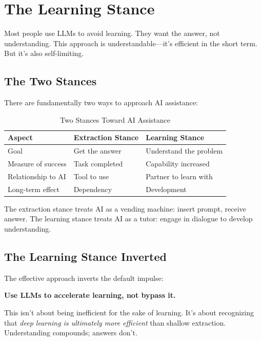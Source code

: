 \chapter{The Learning Stance}

Most people use LLMs to avoid learning. They want the answer, not understanding. This approach is understandable---it's efficient in the short term. But it's also self-limiting.

\section{The Two Stances}

There are fundamentally two ways to approach AI assistance:

\begin{table}[H]
\centering
\begin{tabular}{lp{5cm}p{5cm}}
\toprule
\textbf{Aspect} & \textbf{Extraction Stance} & \textbf{Learning Stance} \\
\midrule
Goal & Get the answer & Understand the problem \\
Measure of success & Task completed & Capability increased \\
Relationship to AI & Tool to use & Partner to learn with \\
Long-term effect & Dependency & Development \\
\bottomrule
\end{tabular}
\caption{Two Stances Toward AI Assistance}
\end{table}

The extraction stance treats AI as a vending machine: insert prompt, receive answer. The learning stance treats AI as a tutor: engage in dialogue to develop understanding.

\section{The Learning Stance Inverted}

The effective approach inverts the default impulse:

\begin{quotebox}
\textbf{Use LLMs to accelerate learning, not bypass it.}
\end{quotebox}

This isn't about being inefficient for the sake of learning. It's about recognizing that \emph{deep learning is ultimately more efficient} than shallow extraction. Understanding compounds; answers don't.

